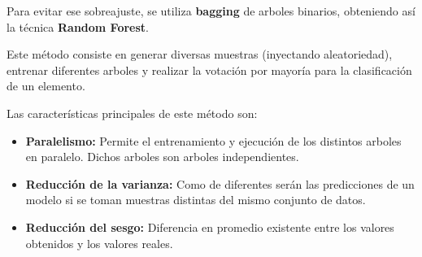 \begin{figure}[ht]
	\centering
		\label{fig: Distintas clasificacioens del arbol binario}
\end{figure}


Para evitar ese sobreajuste, se utiliza \textbf{bagging} de arboles binarios, obteniendo así la técnica \textbf{Random Forest}. 

Este método consiste en generar diversas muestras (inyectando aleatoriedad), entrenar diferentes arboles y realizar la votación por mayoría para la clasificación de un elemento. 

Las características principales de este método son:
\begin{itemize}
  \item \textbf{Paralelismo: }Permite el entrenamiento y ejecución de los distintos arboles en paralelo. Dichos arboles son arboles independientes.
  \item \textbf{Reducción de la varianza: }Como de diferentes serán las predicciones de un modelo si se toman muestras distintas del mismo conjunto de datos.
  \item \textbf{Reducción del sesgo: }Diferencia en promedio existente entre los valores obtenidos y los valores reales.
\end{itemize}

